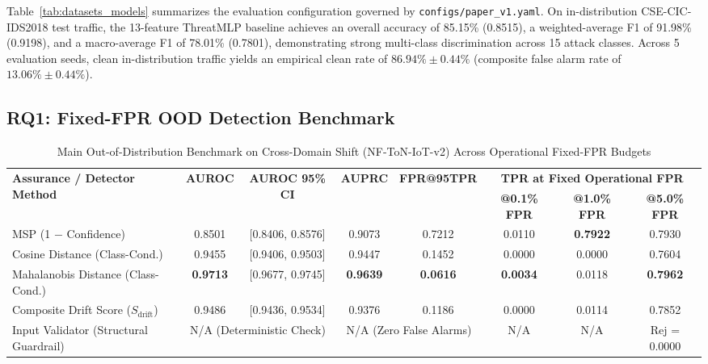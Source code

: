 \documentclass[journal]{IEEEtran}
\begin{document}
Table~\ref{tab:datasets_models} summarizes the evaluation configuration governed by \texttt{configs/paper\_v1.yaml}. On in-distribution CSE-CIC-IDS2018 test traffic, the 13-feature ThreatMLP baseline achieves an overall accuracy of 85.15\% (0.8515), a weighted-average F1 of 91.98\% (0.9198), and a macro-average F1 of 78.01\% (0.7801), demonstrating strong multi-class discrimination across 15 attack classes. Across 5 evaluation seeds, clean in-distribution traffic yields an empirical clean rate of $86.94\% \pm 0.44\%$ (composite false alarm rate of $13.06\% \pm 0.44\%$).

\subsection{RQ1: Fixed-FPR OOD Detection Benchmark}

\begin{table}[t]
  \centering
  \footnotesize
  \caption{Main Out-of-Distribution Benchmark on Cross-Domain Shift (NF-ToN-IoT-v2) Across Operational Fixed-FPR Budgets}
  \label{tab:main_ood_benchmark}
  \setlength{\tabcolsep}{3pt}
  \begin{tabular*}{\textwidth}{@{\extracolsep{\fill}}lccccccc@{}}
    \toprule
    \multirow{2}{*}{\textbf{Assurance / Detector Method}} & \multirow{2}{*}{\textbf{AUROC}} & \multirow{2}{*}{\textbf{AUROC 95\% CI}} & \multirow{2}{*}{\textbf{AUPRC}} & \multirow{2}{*}{\textbf{FPR@95TPR}} & \multicolumn{3}{c}{\textbf{TPR at Fixed Operational FPR}} \\
    \cmidrule(lr){6-8}
     & & & & & \textbf{@0.1\% FPR} & \textbf{@1.0\% FPR} & \textbf{@5.0\% FPR} \\
    \midrule
    MSP (1 $-$ Confidence)~\cite{hendrycks2017baseline} & 0.8501 & [0.8406, 0.8576] & 0.9073 & 0.7212 & 0.0110 & \textbf{0.7922} & 0.7930 \\
    Cosine Distance (Class-Cond.) & 0.9455 & [0.9406, 0.9503] & 0.9447 & 0.1452 & 0.0000 & 0.0000 & 0.7604 \\
    Mahalanobis Distance (Class-Cond.)~\cite{lee2018mahalanobis} & \textbf{0.9713} & [0.9677, 0.9745] & \textbf{0.9639} & \textbf{0.0616} & \textbf{0.0034} & 0.0118 & \textbf{0.7962} \\
    Composite Drift Score ($S_{\text{drift}}$) & 0.9486 & [0.9436, 0.9534] & 0.9376 & 0.1186 & 0.0000 & 0.0114 & 0.7852 \\
    \midrule
    Input Validator (Structural Guardrail) & \multicolumn{2}{c}{N/A (Deterministic Check)} & \multicolumn{2}{c}{N/A (Zero False Alarms)} & N/A & N/A & Rej = 0.0000 \\
    \bottomrule
  \end{tabular*}
\end{table}
\end{document}
